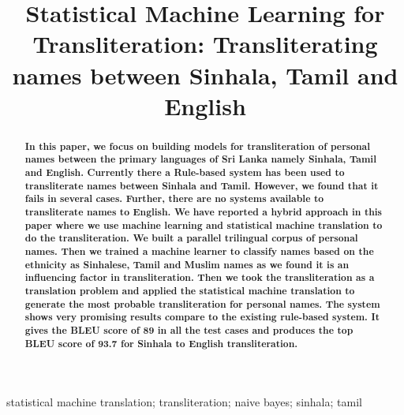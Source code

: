 \documentclass[10pt, a4paper, conference, compsocconf]{IEEEtran}
\begin{document}
\title{Statistical Machine Learning for Transliteration: Transliterating  names between Sinhala, Tamil and English}

\author{
}

\maketitle


\begin{abstract}
\textbf{In this paper, we focus on building models for transliteration of personal names between the primary languages of Sri Lanka namely Sinhala, Tamil and English. Currently there a Rule-based system has been used to transliterate names between Sinhala and Tamil. However, we found that it fails in several cases. Further, there are no systems available to transliterate names to English. We have reported a hybrid approach in this paper where we use machine learning and statistical machine translation to do the transliteration. We built a parallel trilingual corpus of personal names. Then we trained a machine learner to classify names based on the ethnicity as Sinhalese, Tamil and Muslim names as we found it is an influencing factor in transliteration. Then we took the transliteration as a translation problem and applied the statistical machine translation to generate the most probable transliteration for personal names. The system shows very promising results compare to the existing rule-based system. It gives the BLEU score of 89 in all the test cases and produces the top BLEU score of 93.7 for Sinhala to English transliteration.}  

\end{abstract}

\begin{IEEEkeywords}
statistical machine translation; transliteration; naive bayes; sinhala; tamil 

\end{IEEEkeywords}



\IEEEpeerreviewmaketitle
\end{document}
